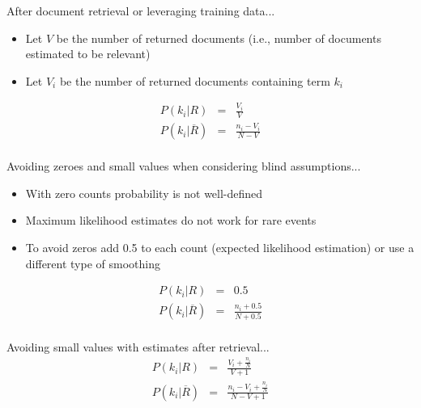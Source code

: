 \documentclass[svgnames]{beamer}
\begin{document}
\begin{frame}[allowframebreaks]
  \begin{block}{After document retrieval or leveraging training data...}
    \begin{itemize}
    \item Let $V$ be the number of returned documents (i.e., number of documents estimated to be relevant)
    \item Let $V_i$ be the number of returned documents containing term $k_i$
    \end{itemize}
    \begin{displaymath}
      \begin{array}{rcl}
        P(k_i|R) &=& \frac{V_i}{V}\\
        P(k_i|\overline{R}) &=& \frac{n_i - V_i}{N - V}\\
      \end{array}
    \end{displaymath}    
  \end{block}
  
  \begin{block}{Avoiding zeroes and small values when considering blind assumptions...}
    \begin{itemize}
    \item With zero counts probability is not well-defined
    \item Maximum likelihood estimates do not work for rare events
    \item To avoid zeros add 0.5 to each count (expected likelihood estimation) or use a different type of smoothing
    \end{itemize}
    \begin{displaymath}
      \begin{array}{rcl}
        P(k_i|R) &=& 0.5\\
        P(k_i|\overline{R}) &=& \frac{n_i + 0.5}{N + 0.5}\\
      \end{array}
    \end{displaymath}   
  \end{block}
  
  \begin{block}{Avoiding small values with estimates after retrieval...}
    \begin{displaymath}
      \begin{array}{rcl}
        P(k_i|R) &=& \frac{V_i + \frac{n_i}{N}}{V + 1}\\
        P(k_i|\overline{R}) &=& \frac{n_i - V_i + \frac{n_i}{N}}{N - V + 1}\\
      \end{array}
    \end{displaymath}    
  \end{block}
\end{frame}
\end{document}
